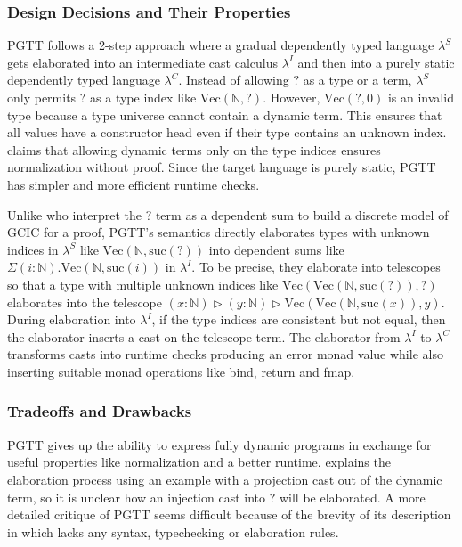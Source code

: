 \documentclass{article}
\theoremstyle{definition}
\begin{document}
\subsubsection{Design Decisions and Their Properties}
PGTT follows a 2-step approach where a gradual dependently typed language
\(\lambda^S\) gets elaborated into an intermediate cast calculus \(\lambda^I\)
and then into a purely static dependently typed language \(\lambda^C\). Instead
of allowing \(?\) as a type or a term, \(\lambda^S\) only permits \(?\) as a
type index like \(\text{Vec}(\mathbb{N}, ?)\). However, \(\text{Vec}(?, 0)\) is
an invalid type because a type universe cannot contain a dynamic term. This
ensures that all values have a constructor head even if their type contains an
unknown index. \citet{shi_partial_2023} claims that allowing dynamic terms only
on the type indices ensures normalization without proof. Since the target
language is purely static, PGTT has simpler and more efficient runtime checks.

Unlike \citet{lennon-bertrand_gradualizing_2022} who interpret the \(?\)
term as a dependent sum to build a discrete model of GCIC for a proof, PGTT's
semantics directly elaborates types with unknown indices in \(\lambda^S\) like
\(\text{Vec}(\mathbb{N}, \text{suc}(?))\) into dependent sums like \(\Sigma
(i:\mathbb{N}).\text{Vec}(\mathbb{N}, \text{suc}(i))\) in \(\lambda^I\). To be
precise, they elaborate into telescopes so that a type with multiple unknown
indices like \(\text{Vec}(\text{Vec}(\mathbb{N}, \text{suc}(?)), ?)\) elaborates
into the telescope
\((x:\mathbb{N})\triangleright(y:\mathbb{N})\triangleright\text{Vec}(\text{Vec}(\mathbb{N},
\text{suc}(x)), y)\). During elaboration into \(\lambda^I\), if the type indices
are consistent but not equal, then the elaborator inserts a cast on the
telescope term. The elaborator from \(\lambda^I\) to \(\lambda^C\) transforms
casts into runtime checks producing an error monad value while also inserting
suitable monad operations like bind, return and fmap.

\subsubsection{Tradeoffs and Drawbacks}
PGTT gives up the ability to express fully dynamic programs in exchange for
useful properties like normalization and a better runtime.
\citet{shi_partial_2023} explains the elaboration process using an example with
a projection cast out of the dynamic term, so it is unclear how an injection
cast into \(?\) will be elaborated. A more detailed critique of PGTT seems
difficult because of the brevity of its description in \citet{shi_partial_2023}
which lacks any syntax, typechecking or elaboration rules.
\end{document}
